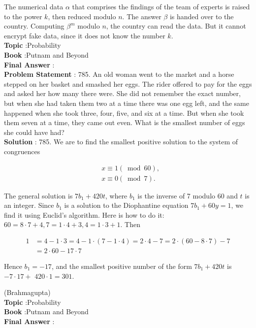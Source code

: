 \documentclass[10pt]{article}
\begin{document}
The numerical data $\alpha$ that comprises the findings of the team of experts is raised to the power $k$, then reduced modulo $n$. The answer $\beta$ is handed over to the country. Computing $\beta^{m}$ modulo $n$, the country can read the data. But it cannot encrypt fake data, since it does not know the number $k$.
\\
\textbf{Topic} :Probability\\
\textbf{Book} :Putnam and Beyond\\
\textbf{Final Answer} :\\


\textbf{Problem Statement} :
785. An old woman went to the market and a horse stepped on her basket and smashed her eggs. The rider offered to pay for the eggs and asked her how many there were. She did not remember the exact number, but when she had taken them two at a time there was one egg left, and the same happened when she took three, four, five, and six at a time. But when she took them seven at a time, they came out even. What is the smallest number of eggs she could have had? 
\\
\textbf{Solution} :
785. We are to find the smallest positive solution to the system of congruences

$$
\begin{aligned}
&x \equiv 1(\bmod 60), \\
&x \equiv 0(\bmod 7) .
\end{aligned}
$$

The general solution is $7 b_{1}+420 t$, where $b_{1}$ is the inverse of 7 modulo 60 and $t$ is an integer. Since $b_{1}$ is a solution to the Diophantine equation $7 b_{1}+60 y=1$, we find it using Euclid's algorithm. Here is how to do it: $60=8 \cdot 7+4,7=1 \cdot 4+3,4=1 \cdot 3+1$. Then

$$
\begin{aligned}
1 &=4-1 \cdot 3=4-1 \cdot(7-1 \cdot 4)=2 \cdot 4-7=2 \cdot(60-8 \cdot 7)-7 \\
&=2 \cdot 60-17 \cdot 7
\end{aligned}
$$

Hence $b_{1}=-17$, and the smallest positive number of the form $7 b_{1}+420 t$ is $-7 \cdot 17+$ $420 \cdot 1=301$.

(Brahmagupta)
\\
\textbf{Topic} :Probability\\
\textbf{Book} :Putnam and Beyond\\
\textbf{Final Answer} :\\
\end{document}

